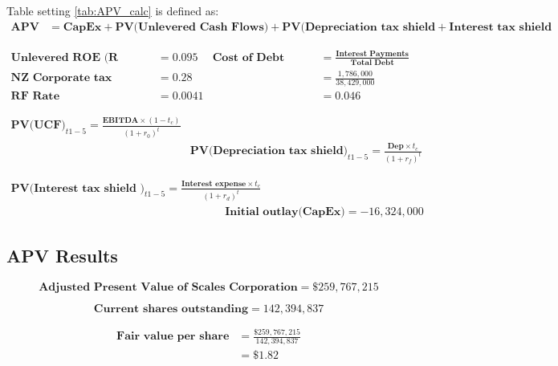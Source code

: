 \documentclass{article}
\begin{document}
\begin{landscape}
Table setting \ref{tab:APV_calc} is defined as:
\begin{equation*}
\begin{split}
\textbf{APV} &= \textbf{CapEx} + \textbf{PV(Unlevered Cash Flows)} + \textbf{PV(Depreciation tax shield}
                + \textbf{Interest tax shield}
\end{split}
\end{equation*}

\begin{align*}
\textbf{Unlevered ROE (R Zero) } &= 0.095         &\textbf{Cost of Debt (Rd) } &= \frac{\textbf{Interest Payments}}{\textbf{Total Debt}} \\
\textbf{NZ Corporate tax } &= 0.28                &             &= \frac{1,786,000}{38,429,000} \\
\textbf{RF Rate} &= 0.0041                        &             &= 0.046
\end{align*}

\begin{align*}
\textbf{PV(UCF)}_{t1-5} = \frac{\textbf{EBITDA}\times (1-t_c)}{(1+r_0)^t} \\ &
\textbf{PV(Depreciation tax shield)}_{t1-5} = \frac{\textbf{Dep}\times t_c}{(1+r_f)^t} 
\end{align*}

\begin{align*}
\textbf{PV(Interest tax shield )}_{t1-5} = \frac{\textbf{Interest expense}\times t_c}{(1+r_d)^t} \\&
\textbf{Initial outlay(CapEx)} = -16,324,000
\end{align*}

\end{landscape}
\subsection{APV Results}

\begin{equation*}
\textbf{Adjusted Present Value of Scales Corporation} = \$259,767,215 
\end{equation*}

\begin{equation*}
\textbf{Current shares outstanding} = 142,394,837
\end{equation*}

\begin{equation*}
\begin{split}
\textbf{Fair value per share} &= \frac{\$259,767,215}{142,394,837} \\
                              &= \$1.82
\end{split}
\end{equation*}
\end{document}
